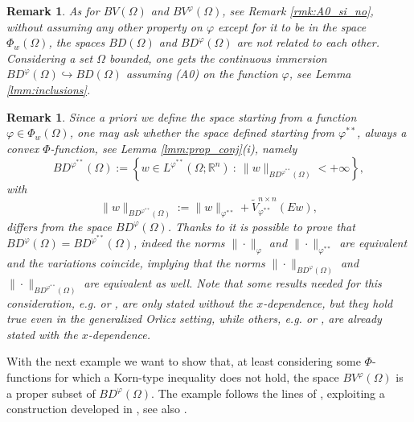 \documentclass[a4paper,11pt,oneside,notitlepage]{article}
\newtheorem{remark}[theorem]{Remark}
\numberwithin{equation}{section}
\def\R{\mathbb{R}}
\newcommand{\vphi}{\varphi}
\newcommand{\st}{ \ : \ }
\begin{document}
\begin{remark}
\label{rmk:A0_si_no_BD}
    As for $BV(\Omega)$ and $BV^\vphi(\Omega)$, see Remark \ref{rmk:A0_si_no}, without assuming any other property on $\vphi$ except for it to be in the space $\Phi_w(\Omega)$, the spaces $BD(\Omega)$ and $BD^\vphi(\Omega)$ are not related to each other. Considering a set $\Omega$ bounded, one gets the continuous immersion $BD^\vphi(\Omega) \hookrightarrow BD(\Omega)$ assuming (A0) on the function $\vphi$, see Lemma \ref{lmm:inclusions}.
\end{remark}

\begin{remark}
\label{rmk:BD-phi=BD-tilde}
    Since a priori we define the space starting from a function $\vphi \in \Phi_w(\Omega)$, one may ask whether the space defined starting from $\vphi^{**}$, always a convex $\Phi$-function, see Lemma \ref{lmm:prop_conj}(i), namely
    \begin{equation*}
        BD^{\vphi^{**}}(\Omega) := \left\{ w \in L^{\vphi^{**}}(\Omega;\R^n) \st \|w\|_{BD^{\vphi^{**}}(\Omega)} < +\infty \right\},
    \end{equation*}
    with
    \begin{equation*}
        \|w\|_{BD^{\vphi^{**}}(\Omega)} := \|w\|_{\vphi^{**}} + \widetilde{V}^{n \times n}_{\vphi^{**}}(E w),
    \end{equation*}
    differs from the space $BD^\vphi(\Omega)$. Thanks to \cite[Proposition 2.4.5 \& Proposition 3.2.4]{HaH} it is possible to prove that $BD^\vphi(\Omega) = BD^{\vphi^{**}}(\Omega)$, indeed the norms $\|\cdot\|_\vphi$ and $\|\cdot\|_{\vphi^{**}}$ are equivalent and the variations coincide, implying that the norms $\|\cdot\|_{BD^\vphi(\Omega)}$ and $\|\cdot\|_{BD^{\vphi^{**}}(\Omega)}$ are equivalent as well. Note that some results needed for this consideration, e.g. \cite[Lemma 2.4.3]{HaH} or \cite[Proposition 2.4.5]{HaH}, are only stated without the $x$-dependence, but they hold true even in the generalized Orlicz setting, while others, e.g. \cite[Theorem 2.5.10]{HaH} or \cite[Proposition 3.2.4]{HaH}, are already stated with the $x$-dependence.
\end{remark}

With the next example we want to show that, at least considering some $\Phi$-functions for which a Korn-type inequality does not hold, the space $BV^\vphi(\Omega)$ is a proper subset of $BD^\vphi(\Omega)$. The example follows the lines of \cite[Example 7.7]{ACD}, exploiting a construction developed in \cite{O62}, see also \cite[Chapter I, Subsection 1.3]{temam}.
\end{document}
